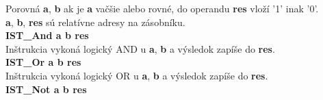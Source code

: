 \documentclass[12pt,a4paper,titlepage,final]{article}
\begin{document}
Porovná \textbf{a}, \textbf{b} ak je \textbf{a} vačšie alebo rovné, do operandu \textbf{res} vloží '1' inak '0'.\\
\textbf{a}, \textbf{b}, \textbf{res} sú relatívne adresy na zásobníku.\\
\textbf{IST\_And a b res}\\
Inštrukcia vykoná logický AND u \textbf{a}, \textbf{b} a výsledok zapíše do \textbf{res}.\\
\textbf{IST\_Or a b res}\\
Inštrukcia vykoná logický OR u \textbf{a}, \textbf{b} a výsledok zapíše do \textbf{res}.\\
\textbf{IST\_Not a b res}\\

\end{document}
